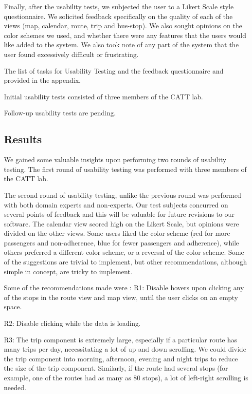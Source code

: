 \documentclass[journal]{vgtc}                %
\begin{document}
Finally, after the usability tests, we subjected the user to a Likert Scale style questionnaire. We solicited feedback specifically on the quality of each of the views (map, calendar, route, trip and bus-stop). We also sought opinions on the color schemes we used, and whether there were any features that the users would like added to the system. We also took note of any part of the system that the user found excessively difficult or frustrating.

The list of tasks for Usability Testing and the feedback questionnaire and provided in the appendix. 

Initial usability tests consisted of three members of the CATT lab.

Follow-up usability tests are pending.

\subsection{Results}
We gained some valuable insights upon performing two rounds of usability testing. The first round of usability testing was performed with three members of the CATT lab. 

The second round of usability testing, unlike the previous round was performed with both domain experts and non-experts. Our test subjects concurred on several points of feedback and this will be valuable for future revisions to our software. The calendar view scored high on the Likert Scale, but opinions were divided on the other views. Some users liked the color scheme (red for more passengers and non-adherence, blue for fewer passengers and adherence), while others preferred a different color scheme, or a reversal of the color scheme. Some of the suggestions are trivial to implement, but other recommendations, although simple in concept, are tricky to implement. 

Some of the recommendations made were : 
R1: Disable hovers upon clicking any of the stops in the route view and map view, until the user clicks on an empty space. 

R2: Disable clicking while the data is loading. 

R3: The trip component is extremely large, especially if a particular route has many trips per day, necessitating a lot of up and down scrolling. We could divide the trip component into morning, afternoon, evening and night trips to reduce the size of the trip component. Similarly, if the route had several stops (for example, one of the routes had as many as 80 stops), a lot of left-right scrolling is needed. 
\end{document}
